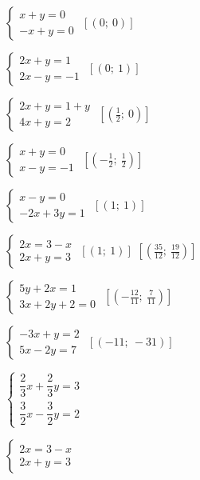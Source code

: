 \begin{esercizio}[\Ast]
\begin{multicols}{2}
\begin{enumeratea}
 \item $\left\{\begin{array}{l}x+y=0\\-x+y=0\end{array}\right.$
 \hfill $\left[(0;~0)\right]$
 \item $\left\{\begin{array}{l}2x+y=1 \\2x-y=-1\end{array}\right.$
 \hfill $\left[(0;~1)\right]$
 \item $\left\{\begin{array}{l}2x+y=1+y\\4x+y=2\end{array}\right.$
 \hfill $\left[\left(\frac{1}{2};~0\right)\right]$
 \item $\left\{\begin{array}{l}x+y=0\\x-y=-1\end{array}\right.$
 \hfill $\left[\left(-{\frac{1}{2}};~\frac{1}{2}\right)\right]$
 \item $\left\{\begin{array}{l}x-y=0\\-2x+3y=1\end{array}\right.$
 \hfill $\left[(1;~1)\right]$
 \item $\left\{\begin{array}{l}2x=3-x\\2x+y=3\end{array}\right.$
 \hfill $\left[(1;~1)\right]$
 \hfill $\left[\left(\frac{35}{12};~\frac{19}{12}\right)\right]$
 \item $\left\{\begin{array}{l}5y+2x=1 \\3x+2y+2=0\end{array}\right.$
 \hfill $\left[\left(-{\frac{12}{11}};~\frac{7}{11}\right)\right]$
 \item $\left\{\begin{array}{l}-3x+y=2\\5x-2y=7\end{array}\right.$
 \hfill $\left[(-11;~-31)\right]$
 \item $\left\{\begin{array}{l}
 \dfrac{2}{3}x+\dfrac{2}{3}y=3\\
 \dfrac{3}{2}x-\dfrac{3}{2}y=2\end{array}\right.$
 \item $\left\{\begin{array}{l}2x=3-x\\2x+y=3\end{array}\right.$

\end{enumeratea}
\end{multicols}
\end{esercizio}
